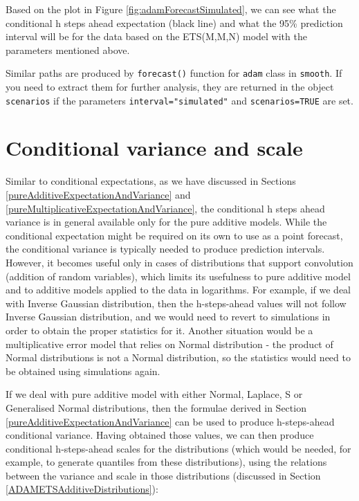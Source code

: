 \documentclass[]{book}
\theoremstyle{definition}
\theoremstyle{definition}
\theoremstyle{definition}
\theoremstyle{definition}
\theoremstyle{remark}
\begin{document}
Based on the plot in Figure \ref{fig:adamForecastSimulated}, we can see what the conditional h steps ahead expectation (black line) and what the 95\% prediction interval will be for the data based on the ETS(M,M,N) model with the parameters mentioned above.

Similar paths are produced by \texttt{forecast()} function for \texttt{adam} class in \texttt{smooth}. If you need to extract them for further analysis, they are returned in the object \texttt{scenarios} if the parameters \texttt{interval="simulated"} and \texttt{scenarios=TRUE} are set.

\hypertarget{ADAMForecastingVariance}{%
\section{Conditional variance and scale}\label{ADAMForecastingVariance}}

Similar to conditional expectations, as we have discussed in Sections \ref{pureAdditiveExpectationAndVariance} and \ref{pureMultiplicativeExpectationAndVariance}, the conditional h steps ahead variance is in general available only for the pure additive models. While the conditional expectation might be required on its own to use as a point forecast, the conditional variance is typically needed to produce prediction intervals. However, it becomes useful only in cases of distributions that support convolution (addition of random variables), which limits its usefulness to pure additive model and to additive models applied to the data in logarithms. For example, if we deal with Inverse Gaussian distribution, then the h-steps-ahead values will not follow Inverse Gaussian distribution, and we would need to revert to simulations in order to obtain the proper statistics for it. Another situation would be a multiplicative error model that relies on Normal distribution - the product of Normal distributions is not a Normal distribution, so the statistics would need to be obtained using simulations again.

If we deal with pure additive model with either Normal, Laplace, S or Generalised Normal distributions, then the formulae derived in Section \ref{pureAdditiveExpectationAndVariance} can be used to produce h-steps-ahead conditional variance. Having obtained those values, we can then produce conditional h-steps-ahead scales for the distributions (which would be needed, for example, to generate quantiles from these distributions), using the relations between the variance and scale in those distributions (discussed in Section \ref{ADAMETSAdditiveDistributions}):
\end{document}
